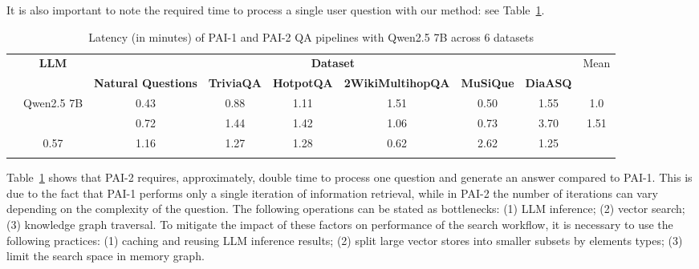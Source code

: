 It is also important to note the required time to process a single user question with our method: see Table~\ref{tab:weak_medium_pai_latency}.

\begin{table}[th!]
    \centering
	\renewcommand{\arraystretch}{1.3}
    \begin{tabular}{|cc|c|c|c|c|c|c||c|}
    \hhline{|-|-|------||-|}
    \multicolumn{1}{|c|}{\multirow{2}{*}{\textbf{Method}}} & \multirow{2}{*}{\textbf{LLM}} & \multicolumn{6}{c||}{\textbf{Dataset}} & \multirow{2}{*}{Mean} \\ 
    \hhline{|~|~|------||~|}
    \multicolumn{1}{|c|}{} &  & \textbf{Natural Questions} & \textbf{TriviaQA} & \textbf{HotpotQA} & \textbf{2WikiMultihopQA} & \textbf{MuSiQue} & \textbf{DiaASQ} &  \\ 
    \hhline{========::=}
    \multicolumn{1}{|c|}{PAI-1} & \multirow{2}{*}{Qwen2.5 7B} & 0.43 & 0.88 & 1.11 & 1.51 & 0.50 & 1.55 & 1.0 \\
    \hhline{|-|~|-|-|-|-|-|-||-|}
    \multicolumn{1}{|c|}{PAI-2} &  & 0.72 & 1.44 & 1.42 & 1.06 & 0.73 & 3.70 & 1.51 \\ 
    \hhline{========::=}
    \multicolumn{2}{|c|}{Mean} & 0.57 & 1.16 & 1.27 & 1.28 & 0.62 & 2.62 & 1.25  \\
    \hhline{|--|-|-|-|-|-|-||-|}
    \end{tabular}%
    \renewcommand{\arraystretch}{1}
    \caption{Latency (in minutes) of PAI-1 and PAI-2 QA pipelines with Qwen2.5 7B across 6 datasets}
	\label{tab:weak_medium_pai_latency}
\end{table}


Table~\ref{tab:weak_medium_pai_latency} shows that PAI-2 requires, approximately, double time to process one question and generate an answer compared to PAI-1. This is due to the fact that PAI-1 performs only a single iteration of information retrieval, while in PAI-2 the number of iterations can vary depending on the complexity of the question. The following operations can be stated as bottlenecks: (1) LLM inference; (2) vector search; (3) knowledge graph traversal. To mitigate the impact of these factors on performance of the search workflow, it is necessary to use the following practices: (1) caching and reusing LLM inference results; (2) split large vector stores into smaller subsets by elements types; (3) limit the search space in memory graph.

